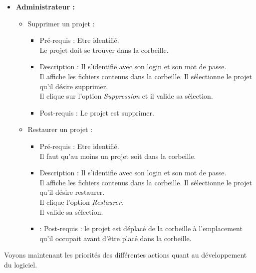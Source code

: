 	\begin{itemize}
	\item {\bf Administrateur :}\\
		\begin{itemize}
		\item Supprimer un projet :
			\begin{itemize}
			\item Pr{\'e}-requis : Etre identifi{\'e}.\\
			Le projet doit se trouver dans la corbeille.
			\item Description : Il s'identifie avec son login et son mot de passe.\\
			Il affiche les fichiers contenus dans la corbeille. Il s{\'e}lectionne le projet qu'il d{\'e}sire supprimer.\\
			Il clique sur l'option {\it Suppression} et il valide sa s{\'e}lection.
			\item Post-requis : Le projet est supprimer.\\
			\end{itemize}

		\item Restaurer un projet :
			\begin{itemize}
			\item Pr{\'e}-requis : Etre identifi{\'e}.\\
			Il faut qu'au moins un projet soit dans la corbeille.
			\item Description : Il s'identifie avec son login et son mot de passe.\\
			Il affiche les fichiers contenus dans la corbeille. Il s{\'e}lectionne le projet qu'il d{\'e}sire restaurer.\\
			Il clique l'option {\it Restaurer}.\\
			Il valide sa s{\'e}lection.
			\item : Post-requis : le projet est d{\'e}plac{\'e} de la corbeille {\`a} l'emplacement qu'il occupait avant d'{\^e}tre plac{\'e} dans la corbeille.\\
			\end{itemize}
		\end{itemize}
	\end{itemize}
\newpage

Voyons maintenant les priorit{\'e}s des diff{\'e}rentes actions quant au
d{\'e}veloppement du logiciel.\\\\\\

